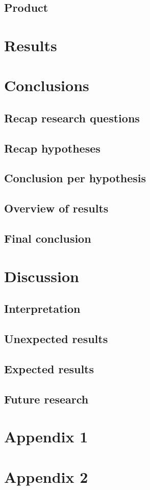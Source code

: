 \documentclass{article}
\begin{document}
 \subsection{Product}
 
 \newpage
 \section{Results} \label{results}
 
 \newpage
 \section{Conclusions}
 \subsection{Recap research questions}
 \subsection{Recap hypotheses}
 \subsection{Conclusion per hypothesis}
 \subsection{Overview of results}
 \subsection{Final conclusion}
 
 \newpage
 \section{Discussion}
 \subsection{Interpretation}
 \subsection{Unexpected results}
 \subsection{Expected results}
 \subsection{Future research}
 
 \newpage
 
 {} 
 
 \newpage
 \begin{appendices}
  \section{Appendix 1}
  \section{Appendix 2}
 \end{appendices}
 
 
\end{document}
